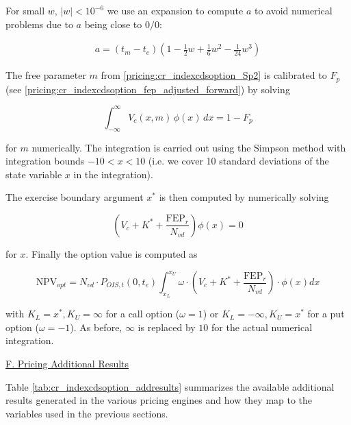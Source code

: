 For small $w$, $|w| < 10^{-6}$ we use an expansion to compute $a$ to avoid numerical problems due to $a$ being close to
$0/0$:

\begin{eqnarray}
a = (t_m-t_e) \left(1 - \frac{1}{2}w+\frac{1}{6}w^2-\frac{1}{24}w^3\right)
\end{eqnarray}

The free parameter $m$ from \ref{pricing:cr_indexcdsoption_Sp2} is calibrated to $F_p$
(see \ref{pricing:cr_indexcdsoption_fep_adjusted_forward}) by solving

\begin{equation}
\int_{-\infty}^{\infty} V_c(x,m) \, \phi(x) \, dx = 1 - F_p
\end{equation}

for $m$ numerically. The integration is carried out using the Simpson method with integration bounds $-10 < x < 10$
(i.e. we cover 10 standard deviations of the state variable $x$ in the integration). 

The exercise boundary argument $x^*$ is then computed by numerically solving

\begin{equation}
\left( V_c + K^* + \frac{\text{FEP}_r}{N_{vd}} \right) \phi(x) = 0
\end{equation}

for $x$. Finally the option value is computed as

\begin{equation}
\text{NPV}_{opt} = N_{vd} \cdot P_{OIS,t}(0,t_e) \int_{x_L}^{x_U} \omega \cdot \left(V_c + K^* + \frac{\text{FEP}_r}{N_{vd}}\right) \cdot \phi(x) dx
\end{equation}

with $K_L= x^*, K_U=\infty$ for a call option ($\omega=1$) or $K_L=-\infty, K_U=x^*$ for a put option ($\omega=-1$). As
before, $\infty$ is replaced by $10$ for the actual numerical integration.

\underline{F. Pricing Additional Results}

Table \ref{tab:cr_indexcdsoption_addresults} summarizes the available additional results generated in the various
pricing engines and how they map to the variables used in the previous sections.

